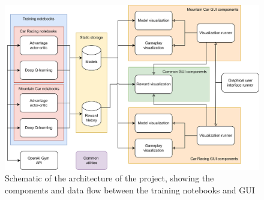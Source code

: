 \begin{figure}[H]
  \centering
  \includegraphics[width=1\textwidth]{figures/images/project_schematic.png}
  \caption[Project architecture schematic]{Schematic of the architecture of the project, showing the components and data flow between the training notebooks and GUI}
  \label{fig:project_schematic}
\end{figure}
